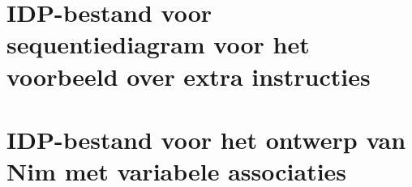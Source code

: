 
\chapter{IDP-bestand voor sequentiediagram voor het voorbeeld over extra instructies}\label{app:new-nim}

\label{code:new-nim}

\chapter{IDP-bestand voor het ontwerp van Nim met variabele associaties}\label{app:nim-assoc}

\label{code:nim-assoc}

%
%

%
%